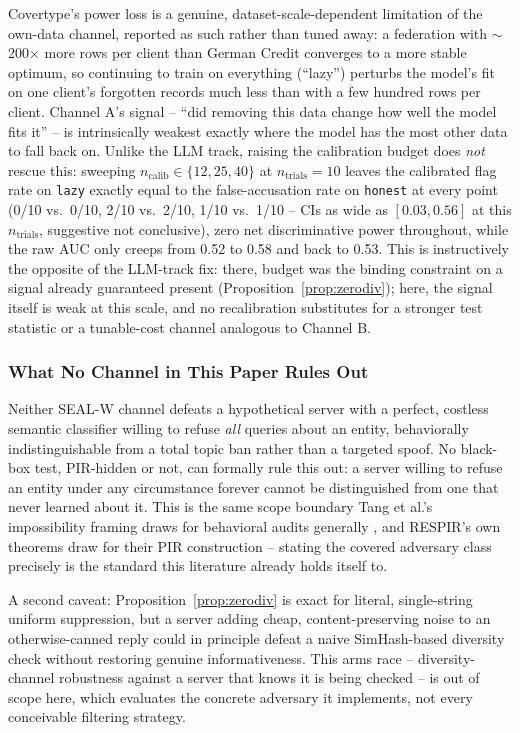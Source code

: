 \documentclass[10pt,journal,compsoc]{IEEEtran}
\begin{document}
Covertype's power loss is a genuine, dataset-scale-dependent limitation of the own-data channel, reported as such rather than tuned away: a federation with $\sim$200$\times$ more rows per client than German Credit converges to a more stable optimum, so continuing to train on everything (``lazy'') perturbs the model's fit on one client's forgotten records much less than with a few hundred rows per client. Channel A's signal -- ``did removing this data change how well the model fits it'' -- is intrinsically weakest exactly where the model has the most other data to fall back on. Unlike the LLM track, raising the calibration budget does \emph{not} rescue this: sweeping $n_{\text{calib}}\in\{12,25,40\}$ at $n_{\text{trials}}=10$ leaves the calibrated flag rate on \texttt{lazy} exactly equal to the false-accusation rate on \texttt{honest} at every point (0/10 vs.\ 0/10, 2/10 vs.\ 2/10, 1/10 vs.\ 1/10 -- CIs as wide as $[0.03,0.56]$ at this $n_{\text{trials}}$, suggestive not conclusive), zero net discriminative power throughout, while the raw AUC only creeps from 0.52 to 0.58 and back to 0.53. This is instructively the opposite of the LLM-track fix: there, budget was the binding constraint on a signal already guaranteed present (Proposition~\ref{prop:zerodiv}); here, the signal itself is weak at this scale, and no recalibration substitutes for a stronger test statistic or a tunable-cost channel analogous to Channel B.

\subsubsection{What No Channel in This Paper Rules Out}

Neither SEAL-W channel defeats a hypothetical server with a perfect, costless semantic classifier willing to refuse \emph{all} queries about an entity, behaviorally indistinguishable from a total topic ban rather than a targeted spoof. No black-box test, PIR-hidden or not, can formally rule this out: a server willing to refuse an entity under any circumstance forever cannot be distinguished from one that never learned about it. This is the same scope boundary Tang et al.'s impossibility framing draws for behavioral audits generally \cite{tang2026geometric}, and RESPIR's own theorems draw for their PIR construction \cite{godinot2026respir} -- stating the covered adversary class precisely is the standard this literature already holds itself to.

A second caveat: Proposition~\ref{prop:zerodiv} is exact for literal, single-string uniform suppression, but a server adding cheap, content-preserving noise to an otherwise-canned reply could in principle defeat a naive SimHash-based diversity check without restoring genuine informativeness. This arms race -- diversity-channel robustness against a server that knows it is being checked -- is out of scope here, which evaluates the concrete adversary it implements, not every conceivable filtering strategy.
\end{document}
